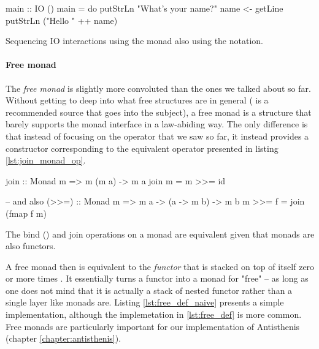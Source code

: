   \begin{code}
\begin{haskellcode}
main :: IO ()
main = do
  putStrLn "What's your name?"
  name <- getLine
  putStrLn ("Hello " ++ name)
\end{haskellcode}
    \caption{\label{lst:io_sugar_example}Sequencing IO interactions
      using the  monad also using the  notation.}
  \end{code}

  \paragraph{Free monad}

  The \emph{free monad} is slightly more convoluted than the ones we
  talked about so far. Without getting to deep into what free
  structures are in general
  (\cite{bartoszmilewskiDaoFunctionalProgramming} is a recommended
  source that goes into the subject), a free monad is a structure that
  barely supports the monad interface in a law-abiding way. The only
  difference is that instead of focusing on the \hask{>>=} operator
  that we saw so far, it instead provides a constructor corresponding
  to the equivalent operator  presented in listing
  \ref{lst:join_monad_op}.

  \begin{code}
\begin{haskellcode}
join :: Monad m => m (m a) -> m a
join m = m >>= id

-- and also
(>>=) :: Monad m => m a -> (a -> m b) -> m b
m >>= f = join (fmap f m)
\end{haskellcode}

    \caption{\label{lst:join_monad_op}The bind (\hask{>>=}) and join
      operations on a monad are equivalent given that monads are also
      functors.}
  \end{code}

  A free monad  then is equivalent to the \emph{functor}
   that is stacked on top of itself zero or more times . It essentially turns a functor into a monad for
  "free" -- as long as one does not mind that it is actually a stack of nested
  functor rather than a single layer like monads are. Listing
  \ref{lst:free_def_naive} presents a simple implementation, although
  the implemetation in \ref{lst:free_def} is more common. Free monads
  are particularly important for our implementation of Antisthenis (chapter \ref{chapter:antisthenis}).

